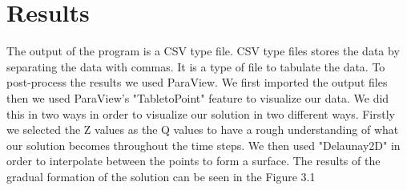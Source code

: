 \documentclass{report}
\begin{document}
\chapter{Results}
The output of the program is a CSV type file. CSV type files stores the data by separating the data with commas. It is a type of file to tabulate the data. To post-process the results we used ParaView. We first imported the output files then we used ParaView's "TabletoPoint" feature to visualize our data. We did this in two ways in order to visualize our solution in two different ways. Firstly we selected the Z values as the Q values to have a rough understanding of what our solution becomes throughout the time steps. We then used "Delaunay2D" in order to interpolate between the points to form a surface. The results of the gradual formation of the solution can be seen in the Figure 3.1
\end{document}
